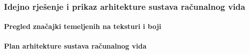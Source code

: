 \documentclass{beamer}
\begin{document}
\begin{frame}
\frametitle{Idejno rješenje i prikaz arhitekture sustava računalnog vida}
\framesubtitle{Pregled značajki temeljenih na teksturi i boji}
\end{frame}

\begin{frame}
\framesubtitle{Plan arhitekture sustava računalnog vida}
\end{frame}
\end{document}
